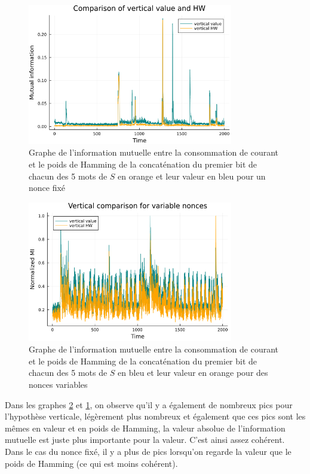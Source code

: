 \documentclass[12pt]{article}
\begin{document}
	\begin{figure}[H]
		\centering
		\includegraphics[width=0.8\textwidth]{img_files/vertical_one_bit}
		\caption{Graphe de l'information mutuelle entre la consommation de courant et le poids de Hamming de la concaténation du premier bit de chacun des 5 mots de $S$ en orange et leur valeur en bleu pour un nonce fixé}
		\label{vHW}
	\end{figure}
	
	\begin{figure}[H]
		\centering
		\includegraphics[width=0.8\textwidth]{img_files/vertical_one_byte}
		\caption{Graphe de l'information mutuelle entre la consommation de courant et le poids de Hamming de la concaténation du premier bit de chacun des 5 mots de $S$ en bleu et leur valeur en orange pour des nonces variables}
		\label{vHW&val}
	\end{figure}
	
	Dans les graphes \ref{vHW&val} et \ref{vHW}, on observe qu'il y a également de nombreux pics pour l'hypothèse verticale, légèrement plus nombreux et également que ces pics sont les mêmes en valeur et en poids de Hamming, la valeur absolue de l'information mutuelle est juste plus importante pour la valeur. C'est ainsi assez cohérent. Dans le cas du nonce fixé, il y a plus de pics lorsqu'on regarde la valeur que le poids de Hamming (ce qui est moins cohérent).
	
\end{document}

